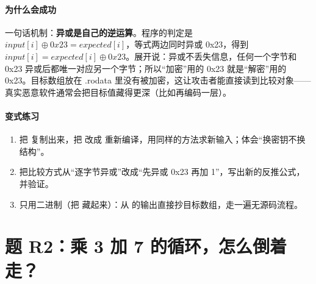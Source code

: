 \documentclass[UTF8,12pt,oneside]{ctexbook}
\begin{document}
\paragraph{为什么会成功}
一句话机制：\textbf{异或是自己的逆运算}。程序的判定是 $input[i] \oplus 0x23 = expected[i]$，等式两边同时异或 0x23，得到 $input[i] = expected[i] \oplus 0x23$。展开说：异或不丢失信息，任何一个字节和 0x23 异或后都唯一对应另一个字节；所以“加密”用的 0x23 就是“解密”用的 0x23。目标数组放在 .rodata 里没有被加密，这让攻击者能直接读到比较对象——真实恶意软件通常会把目标值藏得更深（比如再编码一层）。


\paragraph{变式练习}
\begin{enumerate}
\item 把  复制出来，把  改成  重新编译，用同样的方法求新输入；体会“换密钥不换结构”。
\item 把比较方式从“逐字节异或”改成“先异或 0x23 再加 1”，写出新的反推公式，并验证。
\item 只用二进制（把  藏起来）：从  的输出直接抄目标数组，走一遍无源码流程。
\end{enumerate}

\section{题 R2：乘 3 加 7 的循环，怎么倒着走？}
\end{document}
